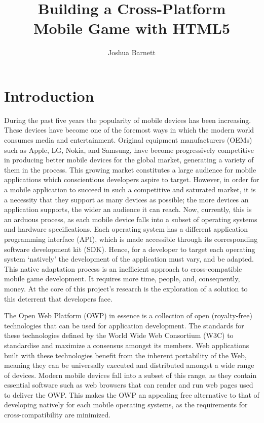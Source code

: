 \documentclass[final]{cmpreport}
\title{Building a Cross-Platform\\Mobile Game with HTML5}
\author{Joshua Barnett}
\begin{document}
\section{Introduction}

During the past five years the popularity of mobile devices has been increasing. These devices have become one of the foremost ways in which the modern world consumes media and entertainment. Original equipment manufacturers (OEMs) such as Apple, LG, Nokia, and Samsung, have become progressively competitive in producing better mobile devices for the global market, generating a variety of them in the process. This growing market constitutes a large audience for mobile applications which conscientious developers aspire to target. However, in order for a mobile application to succeed in such a competitive and saturated market, it is a necessity that they support as many devices as possible; the more devices an application supports, the wider an audience it can reach. Now, currently, this is an arduous process, as each mobile device falls into a subset of operating systems and hardware specifications. Each operating system has a different application programming interface (API), which is made accessible through its corresponding software development kit (SDK). Hence, for a developer to target each operating system `natively' the development of the application must vary, and be adapted. This native adaptation process is an inefficient approach to cross-compatible mobile game development. It requires more time, people, and, consequently, money. At the core of this project's research is the exploration of a solution to this deterrent that developers face.

The Open Web Platform (OWP) in essence is a collection of open (royalty-free) technologies that can be used for application development. The standards for these technologies defined by the World Wide Web Consortium (W3C) to standardise and maximize a consensus amongst its members. Web applications built with these technologies benefit from the inherent portability of the Web, meaning they can be universally executed and distributed amongst a wide range of devices. Modern mobile devices fall into a subset of this range, as they contain essential software such as web browsers that can render and run web pages used to deliver the OWP. This makes the OWP an appealing free alternative to that of developing natively for each mobile operating systems, as the requirements for cross-compatibility are minimized.
\end{document}
